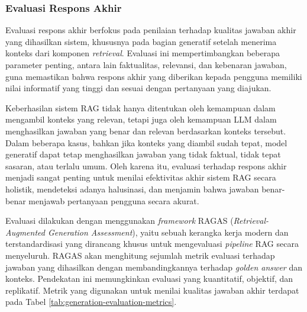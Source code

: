 \subsubsection{Evaluasi Respons Akhir}
Evaluasi respons akhir berfokus pada penilaian terhadap kualitas jawaban akhir yang dihasilkan sistem, khususnya pada bagian generatif setelah menerima konteks dari komponen \textit{retrieval}.
Evaluasi ini mempertimbangkan beberapa parameter penting, antara lain faktualitas, relevansi, dan kebenaran jawaban, guna memastikan bahwa respons akhir yang diberikan kepada pengguna memiliki nilai informatif yang tinggi dan sesuai dengan pertanyaan yang diajukan.

Keberhasilan sistem RAG tidak hanya ditentukan oleh kemampuan dalam mengambil konteks yang relevan, tetapi juga oleh kemampuan LLM dalam menghasilkan jawaban yang benar dan relevan berdasarkan konteks tersebut.
Dalam beberapa kasus, bahkan jika konteks yang diambil sudah tepat, model generatif dapat tetap menghasilkan jawaban yang tidak faktual, tidak tepat sasaran, atau terlalu umum.
Oleh karena itu, evaluasi terhadap respons akhir menjadi sangat penting untuk menilai efektivitas akhir sistem RAG secara holistik, mendeteksi adanya halusinasi, dan menjamin bahwa jawaban benar-benar menjawab pertanyaan pengguna secara akurat.

\vspace{1cm}
Evaluasi dilakukan dengan menggunakan \textit{framework} RAGAS (\textit{Retrieval-Augmented Generation Assessment}), yaitu sebuah kerangka kerja modern dan terstandardisasi yang dirancang khusus untuk mengevaluasi \textit{pipeline} RAG secara menyeluruh.
RAGAS akan menghitung sejumlah metrik evaluasi terhadap jawaban yang dihasilkan dengan membandingkannya terhadap \textit{golden answer} dan konteks. Pendekatan ini memungkinkan evaluasi yang kuantitatif, objektif, dan replikatif.
Metrik yang digunakan untuk menilai kualitas jawaban akhir terdapat pada Tabel \ref{tab:generation-evaluation-metrics}.

